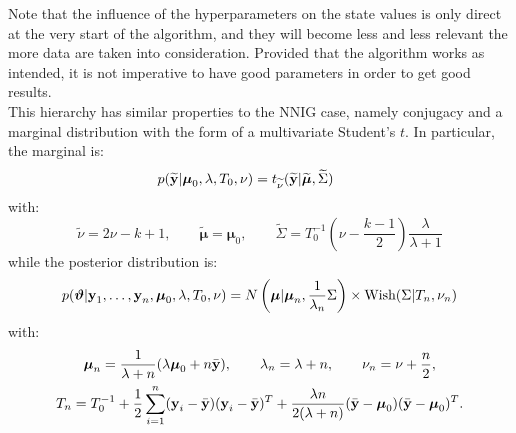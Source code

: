 Note that the influence of the hyperparameters on the state values is only direct at the very start of the algorithm, and they will become less and less relevant the more data are taken into consideration.
Provided that the algorithm works as intended, it is not imperative to have good parameters in order to get good results. \\
This hierarchy has similar properties to the NNIG case, namely conjugacy and a marginal distribution with the form of a multivariate Student's $t$.
In particular, the marginal is:
$$ p(\widetilde{\textbf y} | \boldsymbol\mu_0, \lambda, T_0, \nu) = t_{\widetilde\nu} (\widetilde{\textbf y} | \widetilde{\boldsymbol\mu}, \widetilde\Sigma) \qquad
$$
with:
$$ \widetilde{\nu} = 2\nu - k + 1, \qquad \widetilde{\boldsymbol{\mu}} = \boldsymbol{\mu}_0, \qquad
\widetilde{\Sigma} = T_0^{-1} \left(\nu - \frac{k-1}{2}\right) \frac{\lambda}{\lambda+1}
$$
while the posterior distribution is:
\begin{align*}
p(\boldsymbol\theta|\textbf y_1,\dots,\textbf y_n,\boldsymbol\mu_0,\lambda, T_0, \nu)=N\left(\boldsymbol\mu | \boldsymbol\mu_n, \frac{1}{\lambda_n}\Sigma\right) \times \text{Wish}(\Sigma|T_n, \nu_n)
\end{align*}
with:
\begin{gather*}
\boldsymbol\mu_n = \frac{1}{\lambda+n} (\lambda\boldsymbol \mu_0 + n \bar{\textbf y}), \qquad \lambda_n = \lambda + n, \qquad \nu_n = \nu + \frac{n}{2}, \\
T_n = T_0^{-1} + \frac{1}{2}\sum_{i=1}^{n} (\textbf y_i-\bar{\textbf y})(\textbf y_i-\bar{\textbf y})^T + \frac{\lambda n}{2(\lambda + n)}(\bar{\textbf y}-\boldsymbol\mu_0)(\bar{\textbf y}-\boldsymbol\mu_0)^T.
\end{gather*}
